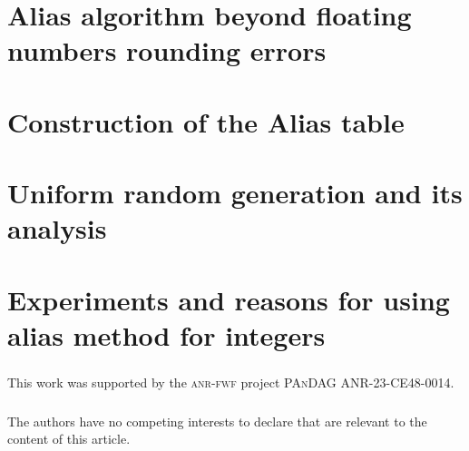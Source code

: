 \documentclass[runningheads]{llncs}
\begin{document}


\section{Alias algorithm beyond floating numbers rounding errors}
\label{sec:walker}




\section{Construction of the Alias table}
\label{sec:algo}




\section{Uniform random generation and its analysis}
\label{sec:gen}




\section{Experiments and reasons for using alias method for integers}
\label{sec:exp}




\begin{credits}
\subsubsection{\ackname} This work
	was supported by the \textsc{anr-fwf} project \textsc{PAnDAG} ANR-23-CE48-0014.

\subsubsection{\discintname}
The authors have no competing interests to declare that are relevant to the content of this article.
\end{credits}




{\raggedright %
}




% 
\end{document}
